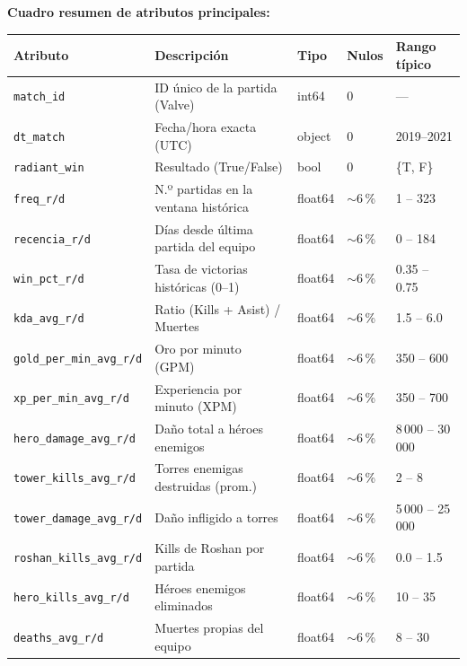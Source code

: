 \documentclass[12pt,a4paper]{article}
\begin{document}
\textbf{Cuadro resumen de atributos principales:}

\begin{center}
\renewcommand{\arraystretch}{1.25}
\begin{longtable}{p{4.2cm}p{3.8cm}p{1.4cm}p{1.2cm}p{2.5cm}}
  \toprule
  \textbf{Atributo} & \textbf{Descripci\'on} & \textbf{Tipo} & \textbf{Nulos} & \textbf{Rango t\'ipico} \\
  \midrule
  \endhead
  \texttt{match\_id}
    & ID \'unico de la partida (Valve)
    & int64 & 0 & --- \\
  \texttt{dt\_match}
    & Fecha/hora exacta (UTC)
    & object & 0 & 2019--2021 \\
  \texttt{radiant\_win}
    & Resultado (True/False)
    & bool & 0 & \{T, F\} \\
  \texttt{freq\_r/d}
    & N.º partidas en la ventana hist\'orica
    & float64 & $\sim$6\,\% & 1 -- 323 \\
  \texttt{recencia\_r/d}
    & D\'ias desde \'ultima partida del equipo
    & float64 & $\sim$6\,\% & 0 -- 184 \\
  \texttt{win\_pct\_r/d}
    & Tasa de victorias hist\'oricas (0--1)
    & float64 & $\sim$6\,\% & 0.35 -- 0.75 \\
  \texttt{kda\_avg\_r/d}
    & Ratio (Kills + Asist) / Muertes
    & float64 & $\sim$6\,\% & 1.5 -- 6.0 \\
  \texttt{gold\_per\_min\_avg\_r/d}
    & Oro por minuto (GPM)
    & float64 & $\sim$6\,\% & 350 -- 600 \\
  \texttt{xp\_per\_min\_avg\_r/d}
    & Experiencia por minuto (XPM)
    & float64 & $\sim$6\,\% & 350 -- 700 \\
  \texttt{hero\_damage\_avg\_r/d}
    & Da\~no total a h\'eroes enemigos
    & float64 & $\sim$6\,\% & 8\,000 -- 30\,000 \\
  \texttt{tower\_kills\_avg\_r/d}
    & Torres enemigas destruidas (prom.)
    & float64 & $\sim$6\,\% & 2 -- 8 \\
  \texttt{tower\_damage\_avg\_r/d}
    & Da\~no infligido a torres
    & float64 & $\sim$6\,\% & 5\,000 -- 25\,000 \\
  \texttt{roshan\_kills\_avg\_r/d}
    & Kills de Roshan por partida
    & float64 & $\sim$6\,\% & 0.0 -- 1.5 \\
  \texttt{hero\_kills\_avg\_r/d}
    & H\'eroes enemigos eliminados
    & float64 & $\sim$6\,\% & 10 -- 35 \\
  \texttt{deaths\_avg\_r/d}
    & Muertes propias del equipo
    & float64 & $\sim$6\,\% & 8 -- 30 \\

\end{longtable}
\end{center}
\end{document}

